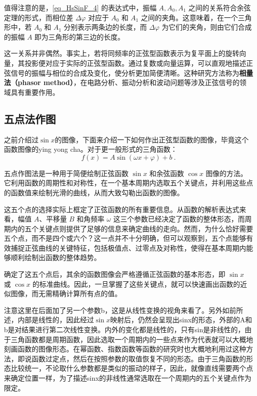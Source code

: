 值得注意的是，\autoref{eq_HsSinF_4} 的表达式中，振幅 $A, A_0, A_1$ 之间的关系符合余弦定理的形式，而相位差 $\Delta \varphi$ 对应于 $A_0$ 和 $A_1$ 之间的夹角。这意味着，在一个三角形中，若 $A_0$ 和 $A_1$ 分别表示两条边的长度，而 $\Delta \varphi$ 为它们的夹角，则由它们合成的振幅 $A$ 即为三角形的第三边的长度。

这一关系并非偶然。事实上，若将同频率的正弦型函数表示为复平面上的旋转向量，其投影便对应于实际的正弦型函数。通过复数或向量运算，可以直观地描述正弦信号的振幅与相位的合成及变化，使分析更加简便清晰。这种研究方法称为\textbf{相量法（phasor method）}，在电路分析、振动分析和波动问题等涉及正弦信号的领域具有重要作用。

\subsection{五点法作图}

之前介绍过$\sin x$的图像，下面来介绍一下如何作出正弦型函数的图像，毕竟这个函数图像的ying yong cha。对于更一般形式的三角函数：
\begin{equation}
f(x) = A \sin(\omega x + \varphi) + b~.
\end{equation}

五点作图法是一种用于简便绘制正弦函数 $\sin x$ 和余弦函数 $\cos x$ 图像的方法。它利用函数的周期性和对称性，在一个基本周期内选取五个关键点，并利用这些点的函数值来绘制光滑的曲线，从而大致勾勒出函数的图像。


这五个点的选择实际上框定了正弦函数的所有重要信息。从函数的解析表达式来看，幅值 $A$、平移量 $B$ 和角频率 $\omega$ 这三个参数已经决定了函数的整体形态，而周期内的五个关键点则提供了足够的信息来确定曲线的走向。然而，为什么恰好需要五个点，而不是四个或六个？这一点并不十分明确，但可以观察到，五个点能够有效捕捉正弦曲线的关键特征，包括极值点、过零点及对称性，使得在基本周期内能够顺利绘制出函数的整体趋势。

确定了这五个点后，其余的函数图像会严格遵循正弦函数的基本形态，即 $\sin x$ 或 $\cos x$ 的标准曲线。因此，一旦掌握了这些关键点，就可以快速画出函数的近似图像，而无需精确计算所有点的值。


注意这里在后面加了另一个参数b，这是从线性变换的视角来看了。另外如前所述，内部是线性的，因此经过$\sin x$映射后，仍然会呈现出sinx的形态，外部的A和b是对结果进行第二次线性变换。内外的变化都是线性的，只有sin是非线性的，由于三角函数都是周期函数，因此选取一个周期内的一些点来作为代表就可以大概地刻画函数的图像形态。在幂函数、指数函数等函数的研究时也大概地利用过这种方法，即说函数过定点，然后在按照参数的取值恢复不同的形态。由于三角函数的形态比较统一，不论取什么参数都是类似的振动的样子，因此，就像直线需要两个点来确定位置一样，为了描述sinx的非线性通常选取在一个周期内的五个关键点作为限定。

